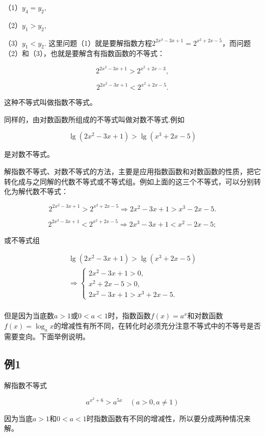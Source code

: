 （1）\(y_{4} = y_{2},\)

（2）\(y_{1} > y_{2},\)

（3）\(y_{1}<y_{2}.\)
这里问题（1）就是要解指数方程\(2^{2x^3 - 3x + 1} = 2^{x^2 + 2x - 5}\)，而问题（2）和（3），也就是要解含有指数函数的不等式：

\[
2^{2 x^{2} - 3 x + 1} > 2^{x^{2} + 2 x - 3}, \tag {1}
\]

\[
2^{2 x^{2} - 3 x + 1} < 2^{x^{2} + 2 x - 5}. \tag {2}
\]

这种不等式叫做指数不等式。

同样的，由对数函数所组成的不等式叫做对数不等式.例如

\[
\lg (2 x^{2} - 3 x + 1) > \lg (x^{3} + 2 x - 5) \tag {3}
\]

是对数不等式。

解指数不等式、对数不等式的方法，主要是应用指数函数和对数函数的性质，把它转化成与之同解的代数不等式或不等式组。例如上面的这三个不等式，可以分别转化为解代数不等式：

\[
2^{2 x^{2} - 3 x + 1} > 2^{x^{2} + 2 x - 5} \Rightarrow 2 x^{2} - 3 x + 1 > x^{3} - 2 x - 5.
\]

\[
2^{2 x^{3} - 3 x + 1} < 2^{x^{2} + 2 x - 5} \Rightarrow 2 x^{3} - 3 x + 1 < x^{2} - 2 x - 5;
\]

或不等式组

\[
\begin{array}{l} \lg (2 x^{2} - 3 x + 1) > \lg (x^{3} + 2 x - 5) \\ \Rightarrow \left\{ \begin{array}{l} 2 x^{2} - 3 x + 1 > 0, \\ x^{2} + 2 x - 5 > 0, \\ 2 x^{2} - 3 x + 1 > x^{3} + 2 x - 5. \end{array} \right. \\ \end{array}
\]

但是因为当底数\(a > 1\)或\(0 < a < 1\)时，指数函数\(f(x) = a^x\)和对数函数\(f(x) = \log_a x\)的增减性有所不同，在转化时必须充分注意不等式中的不等号是否需要变向。下面举例说明。

\subsection{例1}

解指数不等式

\[
a^{x^{2} + 6} > a^{5 x} \quad (a > 0, a \neq 1)
\]

因为当底\(a > 1\)和\(0 < a < 1\)时指数函数有不同的增减性，所以要分成两种情况来解。

